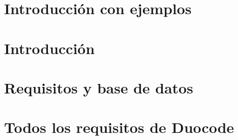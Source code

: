 \documentclass[11pt,a4paper]{article}
\begin{document}
\clearpage
\thispagestyle{empty}
\tableofcontents


\newpage


\section{Introducci\'on con ejemplos}


\newpage
\section{Introducci\'on}

\newpage

\newpage
\section{Requisitos y base de datos}

\newpage

{\small


}


\newpage
\appendix

\section{Todos los requisitos de Duocode}


%
\end{document}
